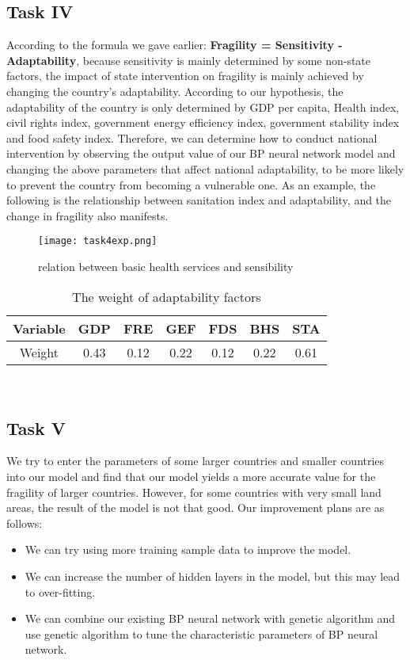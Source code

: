 \documentclass{mcmthesis}
\begin{document}
\subsection{Task IV}
According to the formula we gave earlier:
\textbf{Fragility = Sensitivity - Adaptability}, 
because sensitivity is mainly determined by some non-state 
factors, the impact of state intervention on fragility 
is mainly achieved by changing the country's adaptability. 
According to our hypothesis, the adaptability of the country 
is only determined by GDP per capita, Health index, civil 
rights index, government energy efficiency index, government 
stability index and food safety index. Therefore, we can 
determine how to conduct national intervention by observing 
the output value of our BP neural network model and changing 
the above parameters that affect national adaptability, to be 
more likely to prevent the country from becoming a vulnerable 
one. As an example, the following is the relationship between 
sanitation index and adaptability, and the change in fragility 
also manifests.
\begin{figure}[htbp]
  \centering
  \texttt{[image: task4exp.png]}
  \caption{relation between basic health services and sensibility}
  \label{fig:sanitation}
\end{figure}
\begin{table}
  \centering
  \begin{tabular} {|c|c|c|c|c|c|c|}  
  \hline  
  Variable & GDP & FRE & GEF & FDS & BHS & STA \\ \hline  
  Weight & 0.43 & 0.12 & 0.22 & 0.12 & 0.22 & 0.61  \\ \hline  
  \end{tabular}  
  \caption{The weight of adaptability factors}
\end{table} \\


\subsection{Task V}
We try to enter the parameters of some larger countries and 
smaller countries into our model and find that our model yields 
a more accurate value for the fragility of larger countries. 
However, for some countries with very small land areas, the 
result of the model is not that good. Our improvement plans 
are as follows:
\begin{itemize}
  \item We can try using more training sample data to improve the model.
  \item We can increase the number of hidden layers in the model, but 
  this may lead to over-fitting.
  \item We can combine our existing BP neural network with genetic 
  algorithm and use genetic algorithm to tune the characteristic 
  parameters of BP neural network.
\end{itemize}
\end{document}
